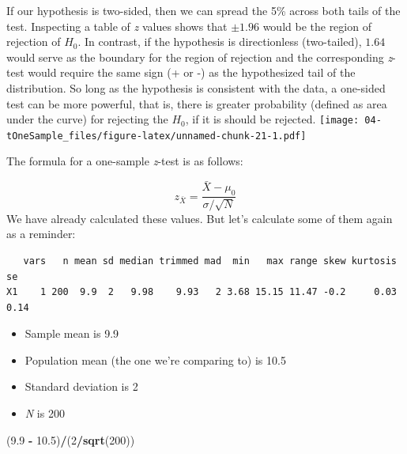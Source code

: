 \documentclass[
  11pt,
]{book}
\newenvironment{Shaded}{\begin{snugshade}}{\end{snugshade}}
\newcommand{\DecValTok}[1]{\textcolor[rgb]{0.06,0.06,0.06}{#1}}
\newcommand{\FloatTok}[1]{\textcolor[rgb]{0.06,0.06,0.06}{#1}}
\newcommand{\FunctionTok}[1]{\textcolor[rgb]{0.27,0.27,0.27}{\textbf{#1}}}
\newcommand{\NormalTok}[1]{#1}
\newcommand{\SpecialCharTok}[1]{\textcolor[rgb]{0.43,0.43,0.43}{\textbf{#1}}}
\providecommand{\tightlist}{%
  \setlength{\itemsep}{0pt}\setlength{\parskip}{0pt}}
\begin{document}
If our hypothesis is two-sided, then we can spread the 5\% across both tails of the test. Inspecting a table of \emph{z} values shows that \(\pm 1.96\) would be the region of rejection of \(H_0\). In contrast, if the hypothesis is directionless (two-tailed), \(1.64\) would serve as the boundary for the region of rejection and the corresponding \emph{z}-test would require the same sign (+ or -) as the hypothesized tail of the distribution. So long as the hypothesis is consistent with the data, a one-sided test can be more powerful, that is, there is greater probability (defined as area under the curve) for rejecting the \(H_0\), if it is should be rejected. \texttt{[image: 04-tOneSample\_files/figure-latex/unnamed-chunk-21-1.pdf]}

The formula for a one-sample \emph{z}-test is as follows:

\[
z_{\bar{X}} =  \frac{\bar{X} - \mu_0}{\sigma / \sqrt{N}}
\] We have already calculated these values. But let's calculate some of them again as a reminder:

\begin{Shaded}
\end{Shaded}

\begin{verbatim}
   vars   n mean sd median trimmed mad  min   max range skew kurtosis   se
X1    1 200  9.9  2   9.98    9.93   2 3.68 15.15 11.47 -0.2     0.03 0.14
\end{verbatim}

\begin{itemize}
\tightlist
\item
  Sample mean is 9.9
\item
  Population mean (the one we're comparing to) is 10.5
\item
  Standard deviation is 2
\item
  \emph{N} is 200
\end{itemize}

\begin{Shaded}
\begin{Highlighting}[]
\NormalTok{(}\FloatTok{9.9} \SpecialCharTok{{-}} \FloatTok{10.5}\NormalTok{)}\SpecialCharTok{/}\NormalTok{(}\DecValTok{2}\SpecialCharTok{/}\FunctionTok{sqrt}\NormalTok{(}\DecValTok{200}\NormalTok{))}
\end{Highlighting}
\end{Shaded}
\end{document}
